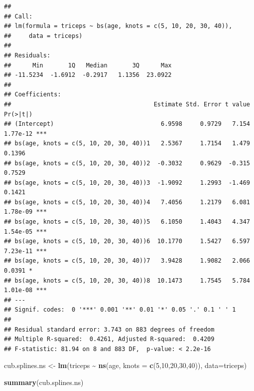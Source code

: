 \documentclass[
]{book}
\newenvironment{Shaded}{\begin{snugshade}}{\end{snugshade}}
\newcommand{\AttributeTok}[1]{\textcolor[rgb]{0.13,0.29,0.53}{#1}}
\newcommand{\DecValTok}[1]{\textcolor[rgb]{0.00,0.00,0.81}{#1}}
\newcommand{\FunctionTok}[1]{\textcolor[rgb]{0.13,0.29,0.53}{\textbf{#1}}}
\newcommand{\NormalTok}[1]{#1}
\newcommand{\OtherTok}[1]{\textcolor[rgb]{0.56,0.35,0.01}{#1}}
\newcommand{\SpecialCharTok}[1]{\textcolor[rgb]{0.81,0.36,0.00}{\textbf{#1}}}
\begin{document}
\begin{verbatim}
## 
## Call:
## lm(formula = triceps ~ bs(age, knots = c(5, 10, 20, 30, 40)), 
##     data = triceps)
## 
## Residuals:
##      Min       1Q   Median       3Q      Max 
## -11.5234  -1.6912  -0.2917   1.1356  23.0922 
## 
## Coefficients:
##                                        Estimate Std. Error t value Pr(>|t|)    
## (Intercept)                              6.9598     0.9729   7.154 1.77e-12 ***
## bs(age, knots = c(5, 10, 20, 30, 40))1   2.5367     1.7154   1.479   0.1396    
## bs(age, knots = c(5, 10, 20, 30, 40))2  -0.3032     0.9629  -0.315   0.7529    
## bs(age, knots = c(5, 10, 20, 30, 40))3  -1.9092     1.2993  -1.469   0.1421    
## bs(age, knots = c(5, 10, 20, 30, 40))4   7.4056     1.2179   6.081 1.78e-09 ***
## bs(age, knots = c(5, 10, 20, 30, 40))5   6.1050     1.4043   4.347 1.54e-05 ***
## bs(age, knots = c(5, 10, 20, 30, 40))6  10.1770     1.5427   6.597 7.23e-11 ***
## bs(age, knots = c(5, 10, 20, 30, 40))7   3.9428     1.9082   2.066   0.0391 *  
## bs(age, knots = c(5, 10, 20, 30, 40))8  10.1473     1.7545   5.784 1.01e-08 ***
## ---
## Signif. codes:  0 '***' 0.001 '**' 0.01 '*' 0.05 '.' 0.1 ' ' 1
## 
## Residual standard error: 3.743 on 883 degrees of freedom
## Multiple R-squared:  0.4261, Adjusted R-squared:  0.4209 
## F-statistic: 81.94 on 8 and 883 DF,  p-value: < 2.2e-16
\end{verbatim}

\begin{Shaded}
\begin{Highlighting}[]
\NormalTok{cub.splines.ns }\OtherTok{\textless{}{-}} \FunctionTok{lm}\NormalTok{(triceps }\SpecialCharTok{\textasciitilde{}} \FunctionTok{ns}\NormalTok{(age, }\AttributeTok{knots =} \FunctionTok{c}\NormalTok{(}\DecValTok{5}\NormalTok{,}\DecValTok{10}\NormalTok{,}\DecValTok{20}\NormalTok{,}\DecValTok{30}\NormalTok{,}\DecValTok{40}\NormalTok{)), }
                   \AttributeTok{data=}\NormalTok{triceps)}

\FunctionTok{summary}\NormalTok{(cub.splines.ns)}
\end{Highlighting}
\end{Shaded}
\end{document}
